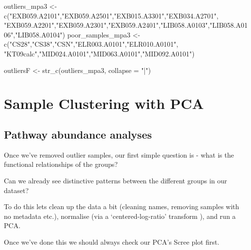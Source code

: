 \documentclass[
  letterpaper,
]{book}
\newenvironment{Shaded}{}{}
\newcommand{\AttributeTok}[1]{\textcolor[rgb]{0.84,0.23,0.29}{#1}}
\newcommand{\FunctionTok}[1]{\textcolor[rgb]{0.44,0.26,0.76}{#1}}
\newcommand{\NormalTok}[1]{\textcolor[rgb]{0.14,0.16,0.18}{#1}}
\newcommand{\OtherTok}[1]{\textcolor[rgb]{0.44,0.26,0.76}{#1}}
\newcommand{\StringTok}[1]{\textcolor[rgb]{0.01,0.18,0.38}{#1}}
\begin{document}
\begin{Shaded}
\begin{Highlighting}[]
\NormalTok{outliers\_mpa3 }\OtherTok{\textless{}{-}} \FunctionTok{c}\NormalTok{(}\StringTok{"EXB059.A2101"}\NormalTok{,}\StringTok{"EXB059.A2501"}\NormalTok{,}\StringTok{"EXB015.A3301"}\NormalTok{,}\StringTok{"EXB034.A2701"}\NormalTok{,}
                   \StringTok{"EXB059.A2201"}\NormalTok{,}\StringTok{"EXB059.A2301"}\NormalTok{,}\StringTok{"EXB059.A2401"}\NormalTok{,}\StringTok{"LIB058.A0103"}\NormalTok{,}\StringTok{"LIB058.A0106"}\NormalTok{,}\StringTok{"LIB058.A0104"}\NormalTok{)}
\NormalTok{poor\_samples\_mpa3 }\OtherTok{\textless{}{-}} \FunctionTok{c}\NormalTok{(}\StringTok{"CS28"}\NormalTok{,}\StringTok{"CS38"}\NormalTok{,}\StringTok{"CSN"}\NormalTok{,}\StringTok{"ELR003.A0101"}\NormalTok{,}\StringTok{"ELR010.A0101"}\NormalTok{,}
                       \StringTok{"KT09calc"}\NormalTok{,}\StringTok{"MID024.A0101"}\NormalTok{,}\StringTok{"MID063.A0101"}\NormalTok{,}\StringTok{"MID092.A0101"}\NormalTok{)}

\NormalTok{outliersF }\OtherTok{\textless{}{-}} \FunctionTok{str\_c}\NormalTok{(outliers\_mpa3, }\AttributeTok{collapse =} \StringTok{"|"}\NormalTok{)}
\end{Highlighting}
\end{Shaded}

\hypertarget{sample-clustering-with-pca}{%
\section{Sample Clustering with PCA}\label{sample-clustering-with-pca}}

\hypertarget{pathway-abundance-analyses}{%
\subsection{Pathway abundance
analyses}\label{pathway-abundance-analyses}}

Once we've removed outlier samples, our first simple question is - what
is the functional relationships of the groups?

Can we already see distinctive patterns between the different groups in
our dataset?

To do this lets clean up the data a bit (cleaning names, removing
samples with no metadata etc.), normalise (via a `centered-log-ratio'
transform ), and run a PCA.

Once we've done this we should always check our PCA's Scree plot first.
\end{document}
